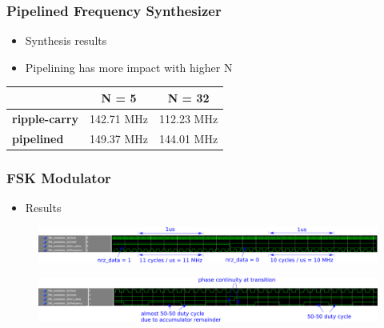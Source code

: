 \documentclass{beamer}
\begin{document}
\begin{frame}
\frametitle{Pipelined Frequency Synthesizer}

\begin{itemize}
    \item Synthesis results
    \item Pipelining has more impact with higher N
\end{itemize}

\begin{table}[!htb]
    \centering
    \begin{tabular}[c]{ l | c | c }
        & \textbf{N = 5} & \textbf{N = 32} \\
        \hline
        \textbf{ripple-carry} & 142.71 MHz & 112.23 MHz \\
        \hline
        \textbf{pipelined} & 149.37 MHz & 144.01 MHz \\
    \end{tabular}
\end{table}

\end{frame}

\begin{frame}
\frametitle{FSK Modulator}

\begin{itemize}
    \item Results
\end{itemize}

\begin{figure}[!htb]
    \centering
    \includegraphics[width=\linewidth]{fsk_10_11_MHz.PNG}
\end{figure}
\begin{figure}[!htb]
    \centering
    \includegraphics[width=\linewidth]{fsk_50-50_phase.PNG}
\end{figure}

\end{frame}
\end{document}
